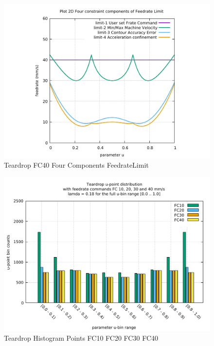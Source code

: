 \begin{figure}
	\caption     {Teardrop FC40 Four Components FeedrateLimit}
	\label{34-img-Teardrop-FC40-Four-Components-FeedrateLimit.pdf}
	\includegraphics[width=1.00\textwidth]{Chap4/appendix/app-Teardrop/plots/34-img-Teardrop-FC40-Four-Components-FeedrateLimit.pdf}
\end{figure}


\clearpage
\pagebreak

\begin{figure}
	\centering
	\caption     {Teardrop Histogram Points FC10 FC20 FC30 FC40}
	\label{35-img-Teardrop-Histogram-Points-FC10-FC20-FC30-FC40.pdf}
\includegraphics[width=1.00\textwidth]{Chap4/appendix/app-Teardrop/plots/35-img-Teardrop-Histogram-Points-FC10-FC20-FC30-FC40.pdf} 
\end{figure}


